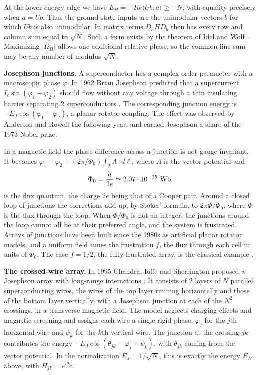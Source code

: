 \documentclass[11pt,a4paper]{article}
\theoremstyle{remark}
\begin{document}
At the lower energy edge we have $E_H=-Re\langle Ub,a\rangle\ge -N$, with equality precisely when $a=Ub$. Thus the ground-state inputs are the unimodular vectors $b$ for which $Ub$ is also unimodular. In matrix terms $D_{\bar a}HD_b$ then has every row and column sum equal to $\sqrt N$. Such a form exists by the theorem of Idel and Wolf \cite{iwo}. Maximizing $|\Omega_H|$ allows one additional relative phase, so the common line sum may be any number of modulus $\sqrt N$.

\medskip
\noindent\textbf{Josephson junctions.}
A superconductor has a complex order parameter with a macroscopic phase $\varphi$. In 1962 Brian Josephson predicted that a supercurrent $I_c\sin(\varphi_1-\varphi_2)$ should flow without any voltage through a thin insulating barrier separating 2 superconductors \cite{jos}. The corresponding junction energy is $-E_J\cos(\varphi_1-\varphi_2)$, a planar rotator coupling. The effect was observed by Anderson and Rowell the following year, and earned Josephson a share of the 1973 Nobel prize.

In a magnetic field the phase difference across a junction is not gauge invariant. It becomes $\varphi_1-\varphi_2-(2\pi/\Phi_0)\int_2^1 A\cdot d\ell$, where $A$ is the vector potential and
\[
 \Phi_0=\frac{h}{2e}\simeq2.07\cdot10^{-15}\ {\rm Wb}
\]
is the flux quantum, the charge $2e$ being that of a Cooper pair. Around a closed loop of junctions the corrections add up, by Stokes' formula, to $2\pi\Phi/\Phi_0$, where $\Phi$ is the flux through the loop. When $\Phi/\Phi_0$ is not an integer, the junctions around the loop cannot all be at their preferred angle, and the system is frustrated. Arrays of junctions have been built since the 1980s as artificial planar rotator models, and a uniform field tunes the frustration $f$, the flux through each cell in units of $\Phi_0$. The case $f=1/2$, the fully frustrated array, is the classical example \cite{tja}.

\medskip
\noindent\textbf{The crossed-wire array.}
In 1995 Chandra, Ioffe and Sherrington proposed a Josephson array with long-range interactions \cite{cis}. It consists of 2 layers of $N$ parallel superconducting wires, the wires of the top layer running horizontally and those of the bottom layer vertically, with a Josephson junction at each of the $N^2$ crossings, in a transverse magnetic field. The model neglects charging effects and magnetic screening and assigns each wire a single rigid phase, $\varphi_j$ for the $j$th horizontal wire and $\psi_k$ for the $k$th vertical wire. The junction at the crossing $jk$ contributes the energy $-E_J\cos(\theta_{jk}-\varphi_j+\psi_k)$, with $\theta_{jk}$ coming from the vector potential. In the normalization $E_J=1/\sqrt N$, this is exactly the energy $E_H$ above, with $H_{jk}=e^{i\theta_{jk}}$.
\end{document}
